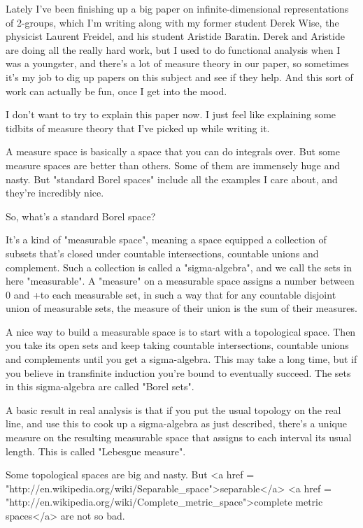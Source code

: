 Lately I've been finishing up a big paper on infinite-dimensional
representations of 2-groups, which I'm writing along with my former
student Derek Wise, the physicist Laurent Freidel, and his student
Aristide Baratin.  Derek and Aristide are doing all the really hard
work, but I used to do functional analysis when I was a youngster, 
and there's a lot of measure theory in our paper, so sometimes it's 
my job to dig up papers on this subject and see if they help.  And 
this sort of work can actually be fun, once I get into the mood.

I don't want to try to explain this paper now.  I just feel like
explaining some tidbits of measure theory that I've picked up while
writing it.

A measure space is basically a space that you can do integrals over.
But some measure spaces are better than others.  Some of them are
immensely huge and nasty.  But "standard Borel spaces" include all 
the examples I care about, and they're incredibly nice.

So, what's a standard Borel space?  

It's a kind of "measurable space", meaning a space equipped a collection
of subsets that's closed under countable intersections, countable
unions and complement.  Such a collection is called a "sigma-algebra",
and we call the sets in here "measurable".  A "measure" on a measurable 
space assigns a number between 0 and +\infty  to each measurable set,
in such a way that for any countable disjoint union of measurable sets,
the measure of their union is the sum of their measures.  

A nice way to build a measurable space is to start with a topological
space.  Then you take its open sets and keep taking countable
intersections, countable unions and complements until you get a
sigma-algebra.  This may take a long time, but if you believe in
transfinite induction you're bound to eventually succeed.  The sets in
this sigma-algebra are called "Borel sets".

A basic result in real analysis is that if you put the usual
topology on the real line, and use this to cook up a sigma-algebra
as just described, there's a unique measure on the resulting measurable
space that assigns to each interval its usual length.  This is called
"Lebesgue measure".

Some topological spaces are big and nasty.  But 
<a href = "http://en.wikipedia.org/wiki/Separable_space">separable</a>
<a href = "http://en.wikipedia.org/wiki/Complete_metric_space">complete
metric spaces</a> are not so bad.  

